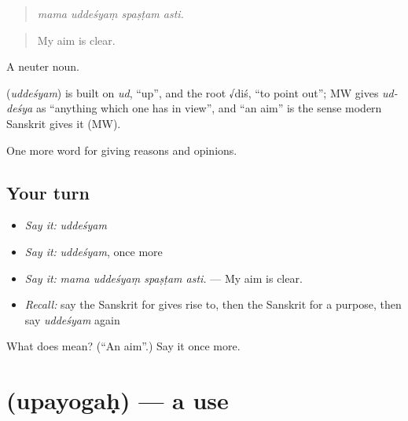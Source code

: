 \begin{quote}
   
\end{quote}

\begin{quote}
\emph{mama uddeśyaṃ spaṣṭam asti.}
\end{quote}

\begin{quote}
My aim is clear.
\end{quote}

A neuter noun.

\begin{cousinweb}
\textbf{} (\emph{uddeśyam}) is built on \emph{ud}, \textquotedblleft{}up\textquotedblright{}, and the root √diś, \textquotedblleft{}to point out\textquotedblright{}; MW gives \emph{ud-deśya} as \textquotedblleft{}anything which one has in view\textquotedblright{}, and \textquotedblleft{}an aim\textquotedblright{} is the sense modern Sanskrit gives it (MW).
\end{cousinweb}

\begin{grammarlens}[title={What you've built}]
One more word for giving reasons and opinions.
\end{grammarlens}

\subsection*{Your turn}
\begin{itemize}
\raggedright
  \item \emph{Say it:} \emph{uddeśyam}
  \item \emph{Say it:} \emph{uddeśyam}, once more
  \item \emph{Say it:} \emph{mama uddeśyaṃ spaṣṭam asti.} — My aim is clear.
  \item \emph{Recall:} say the Sanskrit for gives rise to, then the Sanskrit for a purpose, then say \emph{uddeśyam} again
\end{itemize}

\begin{tcolorbox}[breakable,colback=teal!4,colframe=teal!35!black,title={Before you move on}]
What does  mean? (\textquotedblleft{}An aim\textquotedblright{}.) Say it once more.
\end{tcolorbox}
\section[\texorpdfstring{\sk{उपयोगः} (upayogaḥ)}{उपयोगः (upayogaḥ)}]{ (upayogaḥ) — a use}

